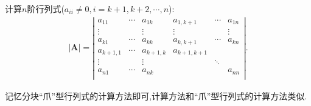\documentclass[../../main.tex]{subfiles}
\begin{document}
\begin{proposition}[分块“爪”型行列式]\label{proposition:分块"爪"型行列式}
计算$n$阶行列式($a_{ii}\ne 0,i=k+1,k+2,\cdots,n$):
\begin{align*}
|\boldsymbol{A}|=\left| \begin{matrix}
a_{11}&		\cdots&		a_{1k}&		a_{1,k+1}&		\cdots&		a_{1n}\\
\vdots&		&		\vdots&		\vdots&		&		\vdots\\
a_{k1}&		\cdots&		a_{kk}&		a_{k,k+1}&		\cdots&		a_{kn}\\
a_{k+1,1}&		\cdots&		a_{k+1,k}&		a_{k+1,k+1}&		&		\\
\vdots&		&		\vdots&		&		\ddots&		\\
a_{n1}&		\cdots&		a_{nk}&		&		&		a_{nn}\\
\end{matrix} \right|.
\end{align*}
\end{proposition}
\begin{note}
记忆分块“爪”型行列式的计算方法即可,计算方法和“爪”型行列式的计算方法类似.
\end{note}
\end{document}
